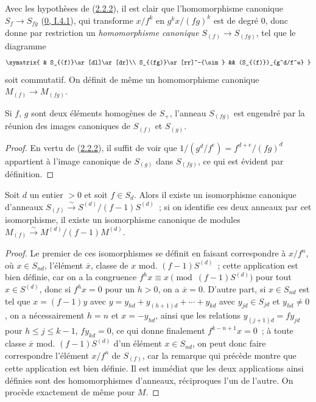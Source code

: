 \begin{env}[2.2.3]
\label{II.2.2.3-fr}
Avec les hypothèses de (\hyperref[II.2.2.2-fr]{2.2.2}), il est clair que
l'homomorphisme canonique $S_f\to S_{fg}$
(\hyperref[0.1.4.1-fr]{0, I.4.1}), qui transforme $x/f^k$ en
$g^k x/(fg)^k$ est de degré $0$, donc donne par restriction un
\emph{homomorphisme canonique $S_{(f)}\to S_{(fg)}$}, tel que le diagramme
\[
  \xymatrix{
    & S_{(f)}\ar[dl]\ar[dr]\\
    S_{(fg)}\ar[rr]^-{\sim} && (S_{(f)})_{g^d/f^e}
  }
\]
soit commutatif. On définit de même un homomorphisme canonique
$M_{(f)}\to M_{(fg)}$.
\end{env}

\begin{lemma}[2.2.4]
\label{II.2.2.4-fr}
Si $f$, $g$ sont deux éléments homogènes de $S_+$, l'anneau $S_{(fg)}$ est
engendré par la réunion des images canoniques de $S_{(f)}$ et $S_{(g)}$.
\end{lemma}

\begin{proof}
En vertu de (\hyperref[II.2.2.2-fr]{2.2.2}), il suffit de voir que
$1/(g^d/f^e)=f^{d+e}/(fg)^d$ appartient à l'image canonique de $S_{(g)}$
dans $S_{(fg)}$, ce qui est évident par définition.
\end{proof}

\begin{proposition}[2.2.5]
\label{II.2.2.5-fr}
Soit $d$ un entier $>0$ et soit $f\in S_d$. Alors il existe un isomorphisme
canonique d'anneaux
$S_{(f)}\xrightarrow{\sim}S^{(d)}/(f-1)S^{(d)}$~; si on identifie ces deux
anneaux par cet isomorphisme, il existe un isomorphisme canonique de modules
$M_{(f)}\xrightarrow{\sim}M^{(d)}/(f-1)M^{(d)}$.
\end{proposition}

\begin{proof}
Le premier de ces isomorphismes se définit en faisant correspondre à
$x/f^n$, où $x\in S_{nd}$, l'élément $\overline{x}$, classe de $x$ mod.
$(f-1)S^{(d)}$~; cette application est bien définie, car on a la congruence
$f^h x\equiv x\pmod{(f-1)S^{(d)}}$ pour tout $x\in S^{(d)}$, donc si
$f^h x=0$ pour un $h>0$,
on a $\overline{x}=0$. D'autre part, si $x\in S_{nd}$ est tel que
$x=(f-1)y$ avec
$y=y_{hd}+y_{(h+1)d}+\cdots+y_{kd}$ avec $y_{jd}\in S_{jd}$ et
$y_{hd}\neq 0$, on a nécessairement $h=n$ et $x=-y_{hd}$, ainsi que les
relations $y_{(j+1)d}=fy_{jd}$ pour $h\leq j\leq k-1$, $fy_{kd}=0$, ce qui
donne finalement $f^{k-n+1}x=0$~; à toute classe $\overline{x}$ mod.
$(f-1)S^{(d)}$ d'un élément $x\in S_{nd}$, on peut donc faire correspondre
l'élément $x/f^n$ de $S_{(f)}$, car la remarque qui précède montre que cette
application est bien définie. Il est immédiat que les deux applications ainsi
définies sont des homomorphismes d'anneaux, réciproques l'un de l'autre. On
procède exactement de même pour $M$.
\end{proof}

